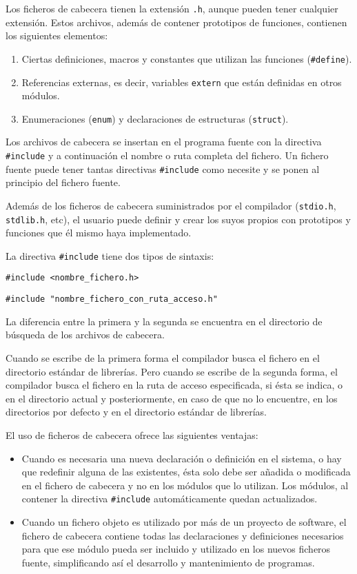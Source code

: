 Los ficheros de cabecera tienen la extensión \texttt{.h}, aunque pueden tener cualquier extensión. Estos archivos, además de contener prototipos de funciones, contienen los siguientes elementos:
\begin{enumerate}
	\item Ciertas definiciones, macros y constantes que utilizan las funciones (\texttt{\#define}).
	\item Referencias externas, es decir, variables \texttt{extern} que están definidas en otros módulos.
	\item Enumeraciones (\texttt{enum}) y declaraciones de estructuras (\texttt{struct}).
\end{enumerate}
Los archivos de cabecera se insertan en el programa fuente con la directiva \texttt{\#include} y a continuación el nombre o ruta completa del fichero. Un fichero fuente puede tener tantas directivas \texttt{\#include} como necesite y se ponen al principio del fichero fuente.

Además de los ficheros de cabecera suministrados por el compilador (\texttt{stdio.h}, \texttt{stdlib.h}, etc), el usuario puede definir y crear los suyos propios con prototipos y funciones que él mismo haya implementado.

La directiva \texttt{\#include} tiene dos tipos de sintaxis:

\texttt{\#include <nombre\_fichero.h>}

\texttt{\#include "nombre\_fichero\_con\_ruta\_acceso.h"}

La diferencia entre la primera y la segunda se encuentra en el directorio de búsqueda de los archivos de cabecera.

Cuando se escribe de la primera forma el compilador busca el fichero en el directorio estándar de librerías. Pero cuando se escribe de la segunda forma, el compilador busca el fichero en la ruta de acceso especificada, si ésta se indica, o en el directorio actual y posteriormente, en caso de que no lo encuentre, en los directorios por defecto y en el directorio estándar de librerías.

El uso de ficheros de cabecera ofrece las siguientes ventajas:
\begin{itemize}
	\item Cuando es necesaria una nueva declaración o definición en el sistema, o hay que redefinir alguna de las existentes, ésta solo debe ser añadida o modificada en el fichero de cabecera y no en los módulos que lo utilizan. Los módulos, al contener la directiva \texttt{\#include} automáticamente quedan actualizados.
	\item Cuando un fichero objeto es utilizado por más de un proyecto de software, el fichero de cabecera contiene todas las declaraciones y definiciones necesarios para que ese módulo pueda ser incluido y utilizado en los nuevos ficheros fuente, simplificando así el desarrollo y mantenimiento de programas.
\end{itemize}

